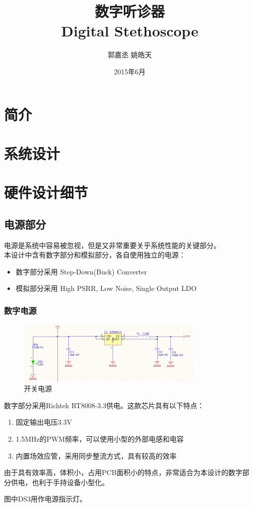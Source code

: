 \documentclass[16pt,a4paper]{article}
\author{郭嘉丞 \quad 姚皓天}
\title{数字听诊器 \\ Digital Stethoscope}
\date{2015年6月}
\begin{document}
\maketitle
\thispagestyle{empty}
\newpage
\section{简介}

\section{系统设计}


\section{硬件设计细节}
\subsection{电源部分}
电源是系统中容易被忽视，但是又非常重要关乎系统性能的关键部分。\\
本设计中含有数字部分和模拟部分，各自使用独立的电源：
\begin{itemize}
\item 数字部分采用 Step-Down(Buck) Converter
\item 模拟部分采用 High PSRR, Low Noise, Single Output LDO
\end{itemize}

\subsubsection{数字电源}
\begin{figure}[H]
\centering
\includegraphics[width=0.8\textwidth]{power1.png}
\caption{开关电源} 
\end{figure}
数字部分采用Richtek RT8008-3.3供电。这款芯片具有以下特点：
\begin{enumerate}
\item 固定输出电压3.3V
\item 1.5MHz的PWM频率，可以使用小型的外部电感和电容
\item 内置场效应管，采用同步整流方式，具有较高的效率
\end{enumerate}\par
由于具有效率高，体积小，占用PCB面积小的特点，非常适合为本设计的数字部分供电，也利于手持设备小型化。\par
图中DS3用作电源指示灯。
\end{document}
